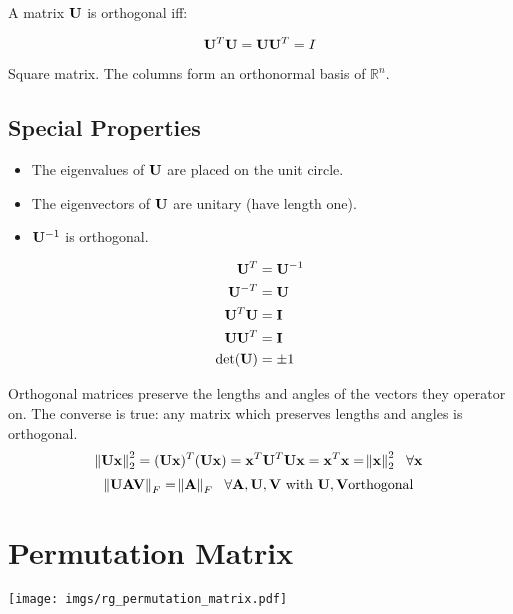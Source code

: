 A matrix $\mathbf{U}$ is orthogonal iff:

\begin{equation}
\mathbf{U}^T \mathbf{U} = \mathbf{U} \mathbf{U}^T = I
\end{equation}

Square matrix. The columns form an orthonormal basis of $\mathbb{R}^n$.



\subsection*{Special Properties}

\begin{itemize}
\item The eigenvalues of $\mathbf{U}$ are placed on the unit circle.
\item The eigenvectors of $\mathbf{U}$ are unitary (have length one).
\item $\mathbf{U}^{-1}$ is orthogonal.
\end{itemize}

\begin{align}
\mathbf{U}^T     &= \mathbf{U}^{-1} \\
\mathbf{U}^{-T}  &= \mathbf{U}      \\
\mathbf{U}^T\mathbf{U}  &= \mathbf{I}      \\
\mathbf{U}\mathbf{U}^T  &= \mathbf{I}      \\
\det(\mathbf{U}) &= \pm1
\end{align}



Orthogonal matrices preserve the lengths and angles of the vectors they operator on. The converse is true: any matrix which preserves lengths and angles is orthogonal.
\begin{equation}
\norm{\mathbf{U} \mathbf{x}}^2_2=(\mathbf{U}\mathbf{x})^T(\mathbf{U}\mathbf{x})=\mathbf{x}^T\mathbf{U}^T\mathbf{U}\mathbf{x}=\mathbf{x}^T\mathbf{x}=\norm{\mathbf{x}}^2_2~~\forall \mathbf{x}
\end{equation}
\begin{equation}
\norm{\mathbf{U} \mathbf{A} \mathbf{V}}_F=\norm{\mathbf{A}}_F~~\forall \mathbf{A},\mathbf{U},\mathbf{V}~\textrm{with}~\mathbf{U},\mathbf{V} \textrm{orthogonal}
\end{equation}



\section{Permutation Matrix}
\begin{center}
\texttt{[image: imgs/rg\_permutation\_matrix.pdf]}
\end{center}

